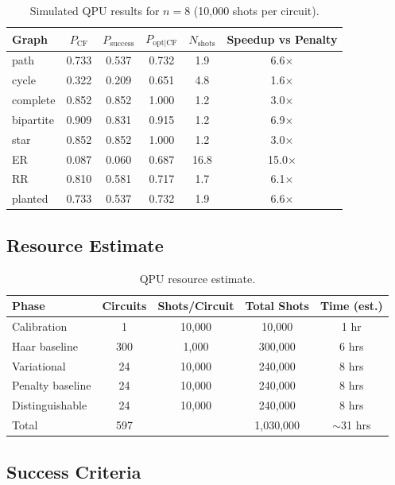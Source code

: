 \begin{table}[ht]
\centering
\caption{Simulated QPU results for $n=8$ (10,000 shots per circuit).}
\label{tab:qpu_n8}
\begin{tabular}{lccccc}
\toprule
Graph & $P_{\mathrm{CF}}$ & $P_{\mathrm{success}}$ & $P_{\mathrm{opt|CF}}$ & $N_{\mathrm{shots}}$ & Speedup vs Penalty \\
\midrule
path & 0.733 & 0.537 & 0.732 & 1.9 & 6.6$\times$ \\
cycle & 0.322 & 0.209 & 0.651 & 4.8 & 1.6$\times$ \\
complete & 0.852 & 0.852 & 1.000 & 1.2 & 3.0$\times$ \\
bipartite & 0.909 & 0.831 & 0.915 & 1.2 & 6.9$\times$ \\
star & 0.852 & 0.852 & 1.000 & 1.2 & 3.0$\times$ \\
ER & 0.087 & 0.060 & 0.687 & 16.8 & 15.0$\times$ \\
RR & 0.810 & 0.581 & 0.717 & 1.7 & 6.1$\times$ \\
planted & 0.733 & 0.537 & 0.732 & 1.9 & 6.6$\times$ \\
\bottomrule
\end{tabular}
\end{table}

\subsection{Resource Estimate}

\begin{table}[ht]
\centering
\caption{QPU resource estimate.}
\label{tab:qpu_resources}
\begin{tabular}{lcccc}
\toprule
Phase & Circuits & Shots/Circuit & Total Shots & Time (est.) \\
\midrule
Calibration & 1 & 10,000 & 10,000 & 1 hr \\
Haar baseline & 300 & 1,000 & 300,000 & 6 hrs \\
Variational & 24 & 10,000 & 240,000 & 8 hrs \\
Penalty baseline & 24 & 10,000 & 240,000 & 8 hrs \\
Distinguishable & 24 & 10,000 & 240,000 & 8 hrs \\
\midrule
Total & 597 & & 1,030,000 & $\sim$31 hrs \\
\bottomrule
\end{tabular}
\end{table}

\subsection{Success Criteria}

